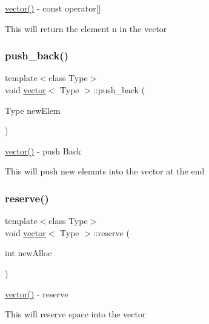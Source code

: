 \hyperlink{classvector_ab8d8ebaa9b91a05bb7a94371cb84c042}{vector()} -\/ const operator\mbox{[}\mbox{]} 

This will return the element n in the vector \hypertarget{classvector_aa09467ef9ad6c97aa952cdbff9085400}{}\label{classvector_aa09467ef9ad6c97aa952cdbff9085400} 
\subsubsection{\texorpdfstring{push\+\_\+back()}{push\_back()}}
{\footnotesize\ttfamily template$<$class Type$>$ \\
void \hyperlink{classvector}{vector}$<$ Type $>$\+::push\+\_\+back (\begin{DoxyParamCaption}\item[{Type}]{new\+Elem }\end{DoxyParamCaption})\hspace{0.3cm}{\ttfamily [inline]}}



\hyperlink{classvector_ab8d8ebaa9b91a05bb7a94371cb84c042}{vector()} -\/ push Back 

This will push new elemnts into the vector at the end \hypertarget{classvector_acb1ede35cda295c9e1729ca981d39e09}{}\label{classvector_acb1ede35cda295c9e1729ca981d39e09} 
\subsubsection{\texorpdfstring{reserve()}{reserve()}}
{\footnotesize\ttfamily template$<$class Type$>$ \\
void \hyperlink{classvector}{vector}$<$ Type $>$\+::reserve (\begin{DoxyParamCaption}\item[{int}]{new\+Alloc }\end{DoxyParamCaption})\hspace{0.3cm}{\ttfamily [inline]}}



\hyperlink{classvector_ab8d8ebaa9b91a05bb7a94371cb84c042}{vector()} -\/ reserve 

This will reserve space into the vector \hypertarget{classvector_a3e51ccc704255ec4acfed8e3d5c7be7f}{}\label{classvector_a3e51ccc704255ec4acfed8e3d5c7be7f} 
